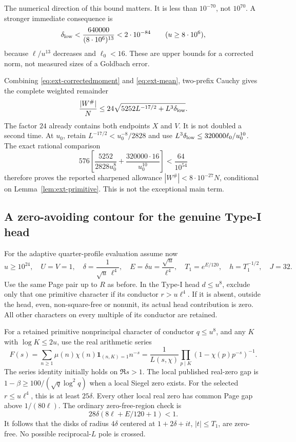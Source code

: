 \documentclass[11pt,a4paper]{article}
\theoremstyle{definition}
\theoremstyle{remark}
\begin{document}
The numerical direction of this bound matters. It is less than
$10^{-70}$, not $10^{70}$. A stronger immediate consequence is
\begin{equation}\label{eq:ext-deltasharp}
 \delta_{\rm low}<\frac{640000}{(8\cdot10^6)^{13}}
                         <2\cdot10^{-84}
 \qquad(u\geq8\cdot10^6),
\end{equation}
because $\ell/u^{13}$ decreases and $\ell_0<16$. These are upper
bounds for a corrected norm, not measured sizes of a Goldbach error.

Combining \eqref{eq:ext-correctedmoment} and \eqref{eq:ext-mean},
two-prefix Cauchy gives the complete weighted remainder
\begin{equation}\label{eq:ext-Wsharp}
 \frac{|W^\#|}{N}
 \leq24\sqrt{5252L^{-17/2}+L^3\delta_{\rm low}}.
\end{equation}
The factor $24$ already contains both endpoints $X$ and $V$.
It is not doubled a second time. At $u_0$, retain
$L^{-17/2}<u_0^{-8}/2828$ and use
$L^3\delta_{\rm low}\leq320000\ell_0/u_0^{10}$.
The exact rational comparison
\[
 576\left[\frac{5252}{2828u_0^8}
                     +\frac{320000\cdot16}{u_0^{10}}\right]
       <\frac{64}{10^{54}}
\]
therefore proves the reported sharpened allowance
$|W^\#|<8\cdot10^{-27}N$, conditional on
Lemma~\ref{lem:ext-primitive}. This is not the exceptional main term.

\subsection{A zero-avoiding contour for the genuine Type-I head}

For the adaptive quarter-profile evaluation assume now
\begin{equation}\label{eq:ext-adaptiveparams}
 u\geq10^{24},\quad U=V=1,\quad
 \delta=\frac1{\sqrt u\,\ell^4},\quad
 E=\delta u=\frac{\sqrt u}{\ell^4},\quad
 T_1=e^{E/120},\quad h=T_1^{-1/2},\quad J=32.
\end{equation}
Use the same Page pair up to $R$ as before. In the Type-I head
$d\leq u^8$, exclude only that one primitive character if its
conductor $r>u\ell^4$. If it is absent, outside the head, even,
non-square-free or nonunit, its actual head contribution is zero.
All other characters on every multiple of its conductor are retained.

For a retained primitive nonprincipal character of conductor $q\leq u^8$,
and any $K$ with $\log K\leq2u$, use the real arithmetic series
\[
 F(s)=\sum_{n\geq1}\mu(n)\chi(n)\mathbf1_{(n,K)=1}n^{-s}
 =\frac1{L(s,\chi)}\prod_{p\mid K}(1-\chi(p)p^{-s})^{-1}.
\]
The series identity initially holds on $\Re s>1$.
The local published real-zero gap is
$1-\beta\geq100/(\sqrt q\log^2q)$ when a local Siegel zero exists.
For the selected $r\leq u\ell^4$, this is at least $25\delta$.
Every other local real zero has common Page gap above $1/(80\ell)$.
The ordinary zero-free-region check is
\[
 28\delta(8\ell+E/120+1)<1.
\]
It follows that the disks of radius $4\delta$ centered at
$1+2\delta+it$, $|t|\leq T_1$, are zero-free. No possible
reciprocal-$L$ pole is crossed.
\end{document}
